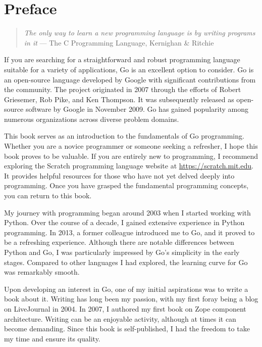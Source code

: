 \cleardoublepage
{}
\chapter*{Preface}

\begin{quote}
\textit{The only way to learn a new programming language is by writing programs in it}
--- The C Programming Language, Kernighan \& Ritchie
\end{quote}

If you are searching for a straightforward and robust programming language
suitable for a variety of applications, Go is an excellent option to consider.
Go is an open-source language developed by Google with significant contributions
from the community. The project originated in 2007 through the efforts of Robert
Griesemer, Rob Pike, and Ken Thompson. It was subsequently released as
open-source software by Google in November 2009. Go has gained popularity among
numerous organizations across diverse problem domains.

This book serves as an introduction to the fundamentals of Go programming.
Whether you are a novice programmer or someone seeking a refresher, I hope this
book proves to be valuable. If you are entirely new to programming, I recommend
exploring the Scratch programming language website
at \url{https://scratch.mit.edu}. It provides helpful resources for those who
have not yet delved deeply into programming. Once you have grasped the
fundamental programming concepts, you can return to this book.

My journey with programming began around 2003 when I started working with
Python. Over the course of a decade, I gained extensive experience in Python
programming. In 2013, a former colleague introduced me to Go, and it proved to
be a refreshing experience. Although there are notable differences between
Python and Go, I was particularly impressed by Go's simplicity in the early
stages. Compared to other languages I had explored, the learning curve for Go
was remarkably smooth.

Upon developing an interest in Go, one of my initial aspirations was to write a
book about it. Writing has long been my passion, with my first foray being a
blog on LiveJournal in 2004. In 2007, I authored my first book on Zope component
architecture. Writing can be an enjoyable activity, although at times it can
become demanding. Since this book is self-published, I had the freedom to take
my time and ensure its quality.

